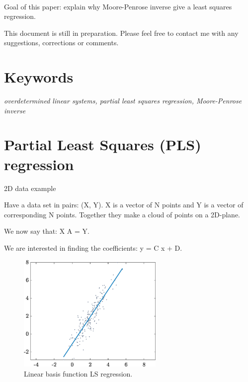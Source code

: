 \documentclass[10pt,twocolumn]{article}
\begin{document}
\,\,

Goal of this paper: explain why Moore-Penrose inverse give a least squares regression.
\,\,

This document is still in preparation. Please feel free to contact me with any suggestions, corrections or comments.

\section*{Keywords}

\textit{overdetermined linear systems, partial least squares regression, Moore-Penrose inverse}

\tableofcontents








\section{Partial Least Squares (PLS) regression}

2D data example



Have a data set in pairs: (X, Y). X is a vector of N points and Y is a vector of corresponding N points. Together they make a cloud of points on a 2D-plane.

We now say that: X A = Y.

We are interested in finding the coefficients: y = C x + D.





\begin{figure}[H]
\centering\includegraphics[width=7cm]{LS-linear-basis-functions.eps}
\caption{Linear basis function LS regression.}
\label{fig:LS-linear-basis}
\end{figure}
\end{document}
